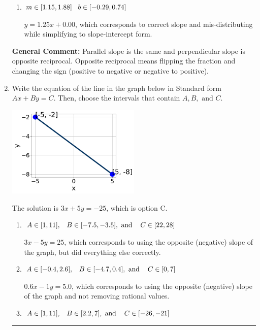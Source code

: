 \documentclass{extbook}[14pt]
\newcommand{\litem}[1]{\item #1

\rule{\textwidth}{0.4pt}}
\begin{document}
\begin{enumerate}
{\begin{enumerate}[label=\Alph*.]
* $y = 1.25x + 1.25$, which is the correct option.
\item \( m \in [1.15, 1.88] \hspace*{3mm} b \in [-0.29, 0.74] \)

 $y = 1.25x + 0.00$, which corresponds to correct slope and mis-distributing while simplifying to slope-intercept form.
\end{enumerate}

\textbf{General Comment:} Parallel slope is the same and perpendicular slope is opposite reciprocal. Opposite reciprocal means flipping the fraction and changing the sign (positive to negative or negative to positive).
}
\litem{
Write the equation of the line in the graph below in Standard form $Ax+By=C$. Then, choose the intervals that contain $A, B, \text{ and } C$.

\begin{center}
    \includegraphics[width=0.5\textwidth]{../Figures/linearGraphToStandardCopyB.png}
\end{center}


The solution is \( 3x + 5y = -25 \), which is option C.\begin{enumerate}[label=\Alph*.]
\item \( A \in [1, 11], \hspace{3mm} B \in [-7.5, -3.5], \text{ and } \hspace{3mm} C \in [22, 28] \)

 $3x - 5y = 25$, which corresponds to using the opposite (negative) slope of the graph, but did everything else correctly.
\item \( A \in [-0.4, 2.6], \hspace{3mm} B \in [-4.7, 0.4], \text{ and } \hspace{3mm} C \in [0, 7] \)

 $0.6x - 1y = 5.0$, which corresponds to using the opposite (negative) slope of the graph and not removing rational values.
\item \( A \in [1, 11], \hspace{3mm} B \in [2.2, 7], \text{ and } \hspace{3mm} C \in [-26, -21] \)


\end{enumerate}}
\end{enumerate}
\end{document}
